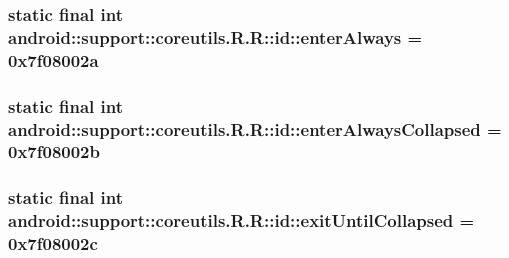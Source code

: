 \hypertarget{classandroid_1_1support_1_1coreutils_1_1_r_1_1id_00cf26d5aa8a102af2e12d5d586196fe}{
\subsubsection[{enterAlways}]{\setlength{\rightskip}{0pt plus 5cm}static final int android::support::coreutils.R.R::id::enterAlways = 0x7f08002a}}
\label{classandroid_1_1support_1_1coreutils_1_1_r_1_1id_00cf26d5aa8a102af2e12d5d586196fe}


\hypertarget{classandroid_1_1support_1_1coreutils_1_1_r_1_1id_eb5b8ac3182da33f4a3f5afbdebd9f31}{
\subsubsection[{enterAlwaysCollapsed}]{\setlength{\rightskip}{0pt plus 5cm}static final int android::support::coreutils.R.R::id::enterAlwaysCollapsed = 0x7f08002b}}
\label{classandroid_1_1support_1_1coreutils_1_1_r_1_1id_eb5b8ac3182da33f4a3f5afbdebd9f31}


\hypertarget{classandroid_1_1support_1_1coreutils_1_1_r_1_1id_355a027aa1d88af038330ef5a15a522d}{
\subsubsection[{exitUntilCollapsed}]{\setlength{\rightskip}{0pt plus 5cm}static final int android::support::coreutils.R.R::id::exitUntilCollapsed = 0x7f08002c}}
\label{classandroid_1_1support_1_1coreutils_1_1_r_1_1id_355a027aa1d88af038330ef5a15a522d}



